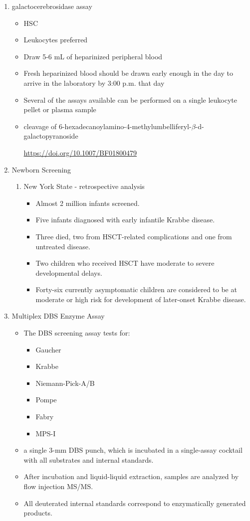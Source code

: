 \documentclass{scrartcl}
\begin{document}
\begin{enumerate}
\begin{enumerate}
\item galactocerebrosidase assay
\label{sec:orgcfc3e07}

\begin{itemize}
\item HSC
\item Leukocytes preferred
\item Draw 5-6 mL of heparinized peripheral blood
\item Fresh heparinized blood should be drawn early enough in the day to arrive in the laboratory by 3:00 p.m. that day
\item Several of the assays available can be performed on a single leukocyte pellet or plasma sample

\item cleavage of 6-hexadecanoylamino-4-methylumbelliferyl-\(\beta\)-d-galactopyranoside

\url{https://doi.org/10.1007/BF01800479}
\end{itemize}


\item Newborn Screening
\label{sec:org4d5d855}
\begin{enumerate}
\item New York State - retrospective analysis
\label{sec:orgdfe0a55}
\begin{itemize}
\item Almost 2 million infants screened.
\item Five infants diagnosed with early infantile Krabbe disease.
\item Three died, two from HSCT-related complications and one from untreated disease.
\item Two children who received HSCT have moderate to severe developmental delays.
\item Forty-six currently asymptomatic children are considered to be at
moderate or high risk for development of later-onset Krabbe disease.
\end{itemize}
\end{enumerate}


\item Multiplex DBS  Enzyme Assay
\label{sec:orgbb8bafe}
\begin{itemize}
\item The DBS screening assay tests for:
\begin{itemize}
\item Gaucher
\item Krabbe
\item Niemann-Pick-A/B
\item Pompe
\item Fabry
\item MPS-I
\end{itemize}
\item a single 3-mm DBS punch, which is incubated in a single-assay
cocktail with all substrates and internal standards.
\item After incubation and liquid-liquid extraction, samples are analyzed by flow injection MS/MS.
\item All deuterated internal standards correspond to enzymatically generated products.
\end{itemize}



\end{enumerate}
\end{enumerate}
\end{document}
